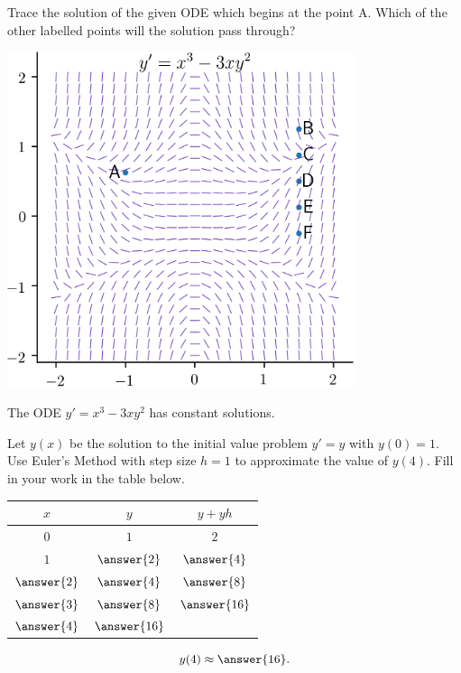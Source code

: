 \documentclass{ximera}
\begin{document}
\begin{exercise}
Trace the solution of the given ODE which begins at the point A. Which of the other labelled points will the solution pass through?
\begin{center}\begin{image}
\includegraphics[width=4in]{images/connect02.png}
\end{image}\end{center}
\begin{multipleChoice}
\end{multipleChoice}
The ODE $y' = x^3 - 3x y^2$ has  constant solutions.
\end{exercise}

\begin{exercise}
Let $y(x)$ be the solution to the initial value problem $y' = y$ with $y(0) = 1$. Use Euler's Method with step size $h = 1$ to approximate the value of $y(4)$. Fill in your work in the table below.
\begin{center}
\begin{tabular}{ccc}
$x$ & $y$  & $y + y h$ \\
\hline
$0$ & $1$  & $2$ \\
$1$ & $\answer{2}$  & $\answer{4}$ \\
$\answer{2}$ & $\answer{4}$  & $\answer{8}$ \\
$\answer{3}$ & $\answer{8}$ &  $\answer{16}$ \\
$\answer{4}$ & $\answer{16}$   &  \\
\end{tabular}
\end{center}
\[ y(4) \approx \answer{16}. \]
\end{exercise}
\end{document}
